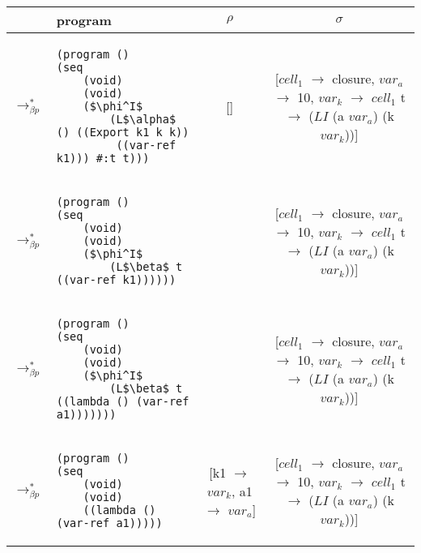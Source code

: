 \begin{table}[!htbp]
  \footnotesize
  \begin{tabular}{l >{\centering\arraybackslash}m{} >{\scriptsize}c >{\scriptsize}c}  %
	&\textbf{program} & \textbf{$\rho$} & \textbf{$\sigma$} \\ \hline \hline
	$\longrightarrow_{\beta p}^*$&\begin{lstlisting}[style=numberless]
(program ()
(seq
	(void)
	(void)
	($\phi^I$
		(L$\alpha$ () ((Export k1 k k))
		 ((var-ref k1))) #:t t)))\end{lstlisting} & [] & \thead{[$cell_1$ $\rightarrow$ closure,\\$var_a$ $\rightarrow$ 10,\\$var_k$ $\rightarrow$ $cell_1$\\t $\rightarrow$ ($LI$\\(a $var_a$) (k $var_k$))]} \\ \hline
	$\longrightarrow_{\beta p}^*$&\begin{lstlisting}[style=numberless]
(program ()
(seq
	(void)
	(void)
	($\phi^I$
		(L$\beta$ t ((var-ref k1))))))\end{lstlisting} & \thead{[k1 $\rightarrow$ $var_k$]} & \thead{[$cell_1$ $\rightarrow$ closure,\\$var_a$ $\rightarrow$ 10,\\$var_k$ $\rightarrow$ $cell_1$\\t $\rightarrow$ ($LI$\\(a $var_a$) (k $var_k$))]} \\ \hline
	$\longrightarrow_{\beta p}^*$&\begin{lstlisting}[style=numberless]
(program ()
(seq
	(void)
	(void)
	($\phi^I$
		(L$\beta$ t ((lambda () (var-ref a1)))))))\end{lstlisting} & \thead{[k1 $\rightarrow$ $var_k$]} & \thead{[$cell_1$ $\rightarrow$ closure,\\$var_a$ $\rightarrow$ 10,\\$var_k$ $\rightarrow$ $cell_1$\\t $\rightarrow$ ($LI$\\(a $var_a$) (k $var_k$))]} \\ \hline
	$\longrightarrow_{\beta p}^*$&\begin{lstlisting}[style=numberless]
(program ()
(seq
	(void)
	(void)
	((lambda () (var-ref a1)))))\end{lstlisting} & \thead{[k1 $\rightarrow$ $var_k$, \\a1 $\rightarrow$ $var_a$]} & \thead{[$cell_1$ $\rightarrow$ closure,\\$var_a$ $\rightarrow$ 10,\\$var_k$ $\rightarrow$ $cell_1$\\t $\rightarrow$ ($LI$\\(a $var_a$) (k $var_k$))]} \\ \hline

\end{tabular}
\end{table}
